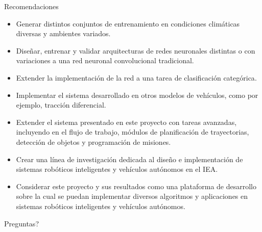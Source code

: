 \documentclass[10pt]{beamer}
\newcommand{\themename}{\textbf{\textsc{metropolis}}\xspace}
\begin{document}
\begin{frame}[allowframebreaks]{Recomendaciones}
    \begin{itemize}
        \item Generar \alert{distintos conjuntos} de entrenamiento en condiciones climáticas diversas y ambientes variados. 
        \item Diseñar, entrenar y validar arquitecturas de \alert{redes neuronales distintas} o con variaciones a una red neuronal convolucional 
        tradicional.
        \item Extender la implementación de la red a una tarea de \alert{clasificación categórica}.
        \item Implementar el sistema desarrollado en \alert{otros modelos de vehículos}, como por ejemplo, tracción diferencial.
        \item Extender el sistema presentado en este proyecto con \alert{tareas avanzadas}, incluyendo en el flujo de trabajo, módulos de planificación de trayectorias, detección de objetos y 
        programación de misiones.
        \item Crear una \alert{línea de investigación} dedicada al diseño e implementación de sistemas robóticos inteligentes y vehículos autónomos en el IEA.
        \item Considerar este proyecto y sus resultados como una \alert{plataforma de desarrollo} sobre la cual se puedan implementar diversos algoritmos y aplicaciones en sistemas robóticos inteligentes y vehículos autónomos.
    
    \end{itemize}
    
\end{frame}


{
\begin{frame}[standout]
  Preguntas?
\end{frame}
}

\appendix

\end{document}
